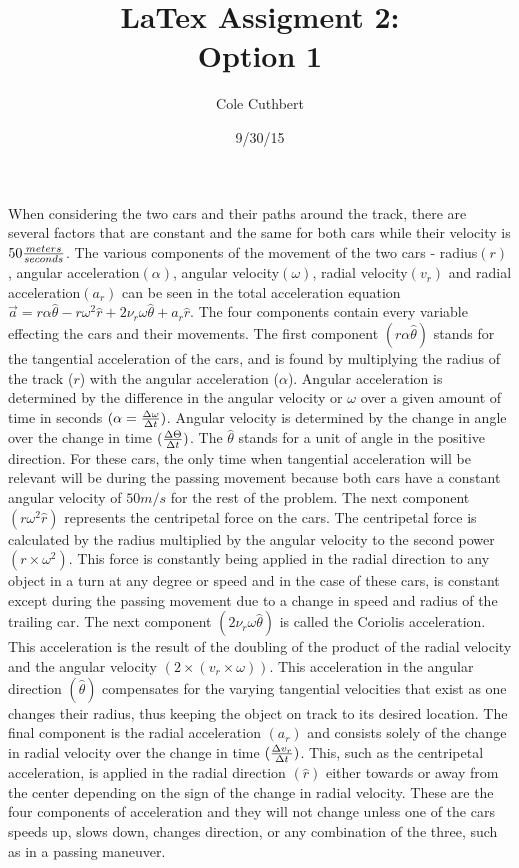 \documentclass[12pt,a4paper]{article}%
\title{LaTex Assigment 2: \\Option 1}
\author{Cole Cuthbert}
\date{9/30/15} %
\begin{document}
\maketitle

	When considering the two cars and their paths around the track, there are several factors that are constant and the same for both cars while their velocity is $50{{meters}\over{seconds}}$. The various components of the movement of the two cars - radius$(r)$, angular acceleration$(\alpha)$, angular velocity$({\omega})$, radial velocity$(v_r)$ and radial acceleration$(a_r)$ can be seen in the total acceleration equation ${\vec{a}}={{r}{\alpha}{\hat{\theta}}-{r}{\omega^2}{\hat{r}}+{2}{\nu_r}{\omega}{\hat\theta}+{a_r}{\hat{r}}}$. The four components contain every variable effecting the cars and their movements. The first component $({r}{\alpha}{\hat{\theta}})$ stands for the tangential acceleration of the cars, and is found by multiplying the radius of the track ($r$) with the angular acceleration ($\alpha$). Angular acceleration is determined by the difference in the angular velocity or $\omega$ over a given amount of time in seconds $({{\alpha}={{\Delta\omega}\over{\Delta}{t}}})$. Angular velocity is determined by the change in angle over the change in time $({{\Delta}{\Theta}\over{\Delta}{t}})$. The ${\hat\theta}$ stands for a unit of angle in the positive direction. For these cars, the only time when tangential acceleration will be relevant will be during the passing movement because both cars have a constant angular velocity of $50m/s$ for the rest of the problem. The next component $({r}{\omega^2}{\hat{r}})$ represents the centripetal force on the cars. The centripetal force is calculated by the radius multiplied by the angular velocity to the second power $(r\times\omega^2)$. This force is constantly being applied in the radial direction to any object in a turn at any degree or speed and in the case of these cars, is constant except during the passing movement due to a change in speed and radius of the trailing car. The next component $({2}{\nu_r}{\omega}{\hat\theta})$ is called the Coriolis acceleration. This acceleration is the result of the doubling of the product of the radial velocity and the angular velocity $(2\times({v_r}\times{\omega}))$. This acceleration in the angular direction $(\hat\theta)$ compensates for the varying tangential velocities that exist as one changes their radius, thus keeping the object on track to its desired location. The final component is the radial acceleration $({a_r})$ and consists solely of the change in radial velocity over the change in time $({{\Delta{v_r}}\over{\Delta{t}}})$. This, such as the centripetal acceleration, is applied in the radial direction $(\hat{r})$ either towards or away from the center depending on the sign of the change in radial velocity. These are the four components of acceleration and they will not change unless one of the cars speeds up, slows down, changes direction, or any combination of the three, such as in a passing maneuver.
	
\end{document}
